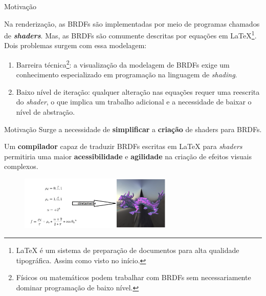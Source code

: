 \begin{frame}[fragile]{Motivação}

    Na renderização, as BRDFs são implementadas por meio de programas chamados de \textit{\textbf{shaders}}. Mas, as BRDFs são comumente descritas por equações em \LaTeX \footnote{\tiny{ \LaTeX{} é um sistema de preparação de documentos para alta qualidade tipográfica. Assim como visto no início.}}. Dois problemas surgem com essa modelagem:

    \begin{enumerate}
        \item Barreira técnica\footnote{\tiny{Físicos ou matemáticos podem trabalhar com BRDFs sem necessariamente dominar programação de baixo nível.}}: a visualização da modelagem de BRDFs exige um conhecimento especializado em programação na linguagem de \textit{shading}.

        \item Baixo nível de iteração: qualquer alteração nas equações requer uma reescrita do \textit{shader}, o que implica um trabalho adicional e a necessidade de baixar o nível de abstração.
    \end{enumerate}

\end{frame}


\begin{frame}{Motivação}
    Surge a necessidade de \textbf{simplificar} a \textbf{criação} de shaders para BRDFs. \\\hspace{2cm}


    Um \textbf{compilador} capaz de traduzir BRDFs escritas em \LaTeX{} para \textit{shaders} permitiria uma maior \textbf{acessibilidade} e \textbf{agilidade} na criação de efeitos visuais complexos.
    \begin{figure}[H]
        \begin{center}
            \includegraphics[width=0.65\textwidth]{./Imagens/diretamente.png}
        \end{center}
    \end{figure}
\end{frame}



